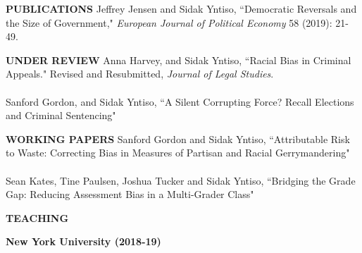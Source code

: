 \documentclass[letterpaper,11pt,oneside]{article}
\begin{document}
	\noindent\textbf{\textsc{PUBLICATIONS}
		\vspace{2mm}}
	\newline
	\noindent
	\hangindent=0.7cm {
		Jeffrey Jensen and Sidak Yntiso,  ``Democratic Reversals and the Size of Government,"  \textit{European Journal of Political Economy} 58 (2019): 21-49. \\
	}
	
	\noindent\textbf{\textsc{UNDER REVIEW}
		\vspace{2mm}}
	\newline
	\noindent
	\hangindent=0.7cm {
		Anna Harvey, and Sidak Yntiso, {``Racial Bias in Criminal Appeals." Revised and Resubmitted, \textit{Journal of Legal Studies}.} \\ \\
	}
	\hangindent=0.7cm {
		Sanford Gordon, and Sidak Yntiso, {``A Silent Corrupting Force? Recall Elections and Criminal Sentencing"} \\
	}
	
	\noindent\textbf{\textsc{WORKING PAPERS}
		\vspace{2mm}}
	\newline
	\noindent
	\hangindent=0.7cm {
		Sanford Gordon and Sidak Yntiso, {``Attributable Risk to Waste: Correcting Bias in Measures of Partisan and Racial Gerrymandering"} \\ \\	
	}
	\hangindent=0.7cm {
		Sean Kates, Tine Paulsen, Joshua Tucker and Sidak Yntiso, {``Bridging the Grade Gap: Reducing Assessment Bias in a Multi-Grader Class"} \\
	}


	\noindent\textbf{\textsc{TEACHING}
		\vspace{-2mm}}
	\newline
	\noindent
	
	\textbf{New York University (2018-19)}\\
	\noindent
	
\end{document}
